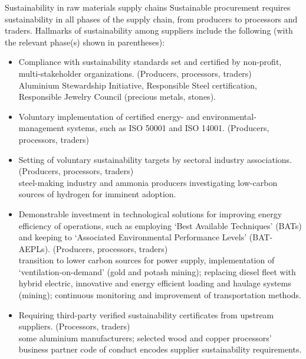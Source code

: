 \documentclass[../SustainableHEP.tex]{subfiles}
\begin{document}
\begin{bestpractice}{Sustainability in raw materials supply chains}%
\noindent Sustainable procurement requires sustainability in all phases of the supply chain, from producers to processors and traders.  Hallmarks of sustainability among suppliers include the following (with the relevant phase(s) shown in parentheses):
\begin{itemize}
    \item Compliance with sustainability standards set and certified by non-profit, multi-stakeholder organizations. (Producers, processors, traders) \\\vspace{-0.1in} 
    {\small \eg Aluminium Stewardship Initiative, Responsible Steel certification, Responsible Jewelry Council (precious metals, stones).}
    \item Voluntary implementation of certified energy- and environmental-management systems, such as ISO 50001 and ISO 14001. (Producers, processors, traders)  
    \item Setting of voluntary sustainability targets by sectoral industry associations. (Producers, processors, traders) \\
    {\small \eg steel-making industry and ammonia producers investigating low-carbon sources of hydrogen for imminent adoption.}
    \item Demonstrable investment in technological solutions for improving energy efficiency of operations, such as employing `Best Available Techniques' (BATs) and keeping to `Associated Environmental Performance Levels' (BAT-AEPLs). (Producers, processors, traders) \\ 
    {\small \eg transition to lower carbon sources for power supply, implementation of `ventilation-on-demand' (gold and potash mining); replacing diesel fleet with hybrid electric, innovative and energy efficient loading and haulage systems (mining); continuous monitoring and improvement of transportation methods.}
    \item Requiring third-party verified sustainability certificates from upstream suppliers. (Processors, traders) \\
    {\small \eg some aluminium manufacturers; selected wood and copper processors' business partner code of conduct encodes supplier sustainability requirements.}
\end{itemize}
\end{bestpractice}
\end{document}
